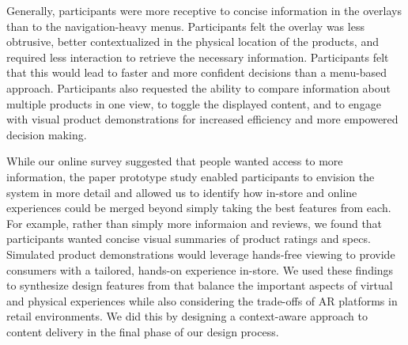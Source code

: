 Generally, participants were more receptive to concise information in the overlays than to the navigation-heavy menus. Participants felt the overlay was less obtrusive, better contextualized in the physical location of the products, and required less interaction to retrieve the necessary information. Participants felt that this would lead to faster and more confident decisions than a menu-based approach. 
Participants also requested the ability to compare information about multiple products in one view, to toggle the displayed content, and to engage with visual product demonstrations for increased efficiency and more empowered decision making.

While our online survey suggested that people wanted access to more information, the paper prototype study enabled participants to envision the system in more detail and allowed us to identify how in-store and online experiences could be merged beyond simply taking the best features from each. For example, rather than simply more informaion and reviews, we found that participants wanted concise visual summaries of product ratings and specs. Simulated product demonstrations would leverage hands-free viewing to provide consumers with a tailored, hands-on experience in-store. 
We used these findings to 
synthesize design features from that balance the important aspects of virtual and physical experiences while also considering the trade-offs of AR platforms in retail environments. 
We did this by designing a context-aware approach to content delivery in the final phase of our design process. 
